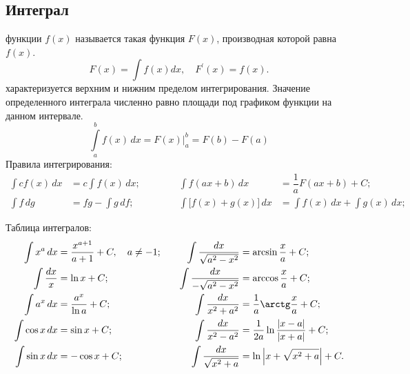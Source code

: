 \subsection{Интеграл}
 функции $f(x)$ называется такая функция $F(x)$, производная которой равна $f(x)$.
\begin{equation}
F(x) = \int f(x)dx,\quad F^\prime(x)=f(x).
\end{equation}
 характеризуется верхним и нижним пределом интегрирования. Значение определенного интеграла численно равно площади под графиком функции на данном интервале.
\begin{equation}
\int\limits^b_a f(x)\,dx = F(x) \biggr|^b_a = F(b) - F(a)
\end{equation}
Правила интегрирования:
\begin{align*}	
\int c f(x) \,dx &= c \int f(x) \,dx;  &&&&&\int f(ax + b) \,dx &= \dfrac{1}{a}F(ax + b) + C;\\
\int f \,dg &= fg - \int g \,df; &&&&& \int \bigl[f(x) + g(x)\bigr] \,dx &= \int f(x) \,dx + \int g(x) \,dx;
\end{align*}

Таблица интегралов:
\begin{align*}
\int  x^a \,dx &= \dfrac{x^{a+1}}{a+1} + C,\quad a \neq -1;\quad & 
\int \dfrac{dx}{\sqrt{a^2 - x^2}} &= \arcsin\dfrac{x}{a} + C;\\
\int \frac{dx}{x} &= \ln x + C; &
\int \dfrac{dx}{-\sqrt{a^2 - x^2}} &= \arccos\dfrac{x}{a} + C;\\
\int a^x \,dx &= \dfrac{a^x}{\ln a} + C; & 
\int \dfrac{dx}{x^2 + a^2} &= \dfrac{1}{a} \arctg \dfrac{x}{a} + C; \\
\int \cos x \,dx &= \sin x + C; & 
\int \dfrac{dx}{x^2 - a^2} &= \dfrac{1}{2a} \ln \dfrac{|x - a|}{|x + a|} + C;\\
\int \sin x \,dx &= -\cos x + C; &
\int \dfrac{dx}{\sqrt{x^2 + a}} &= \ln \left| x + \sqrt{x^2 + a} \right| + C.
\end{align*}